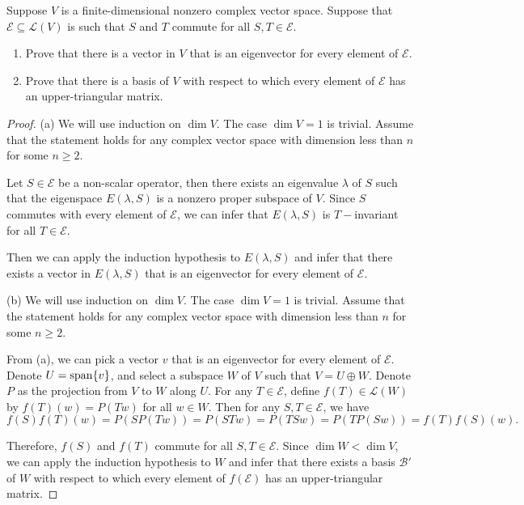 \documentclass{article}
\begin{document}
\begin{problem}[5E-9]
Suppose $V$ is a finite-dimensional nonzero complex vector space. Suppose that $\mathcal{E} \subseteq \mathcal{L}(V)$ is such that $S$ and $T$ commute for all $S, T \in \mathcal{E}$.
\begin{enumerate}[label=(\alph*)]
\item Prove that there is a vector in $V$ that is an eigenvector for every element of $\mathcal{E}$.
\item Prove that there is a basis of $V$ with respect to which every element of $\mathcal{E}$ has an upper-triangular matrix.
\end{enumerate}
\end{problem}

\begin{proof}
  (a) We will use induction on \( \dim V \). The case \( \dim V=1 \) is trivial. Assume that the statement holds for any complex vector space with dimension less than \( n \) for some \( n\geq 2 \). \par
  Let \( S\in\mathcal{E} \) be a non-scalar operator, then there exists an eigenvalue \( \lambda \) of \( S \) such that the eigenspace \( E(\lambda,S) \) is a nonzero proper subspace of \( V \). Since \( S \) commutes with every element of \( \mathcal{E} \), we can infer that \( E(\lambda,S) \) is \( T- \)invariant for all \( T\in\mathcal{E} \). \par
  Then we can apply the induction hypothesis to \( E(\lambda,S) \) and infer that there exists a vector in \( E(\lambda,S) \) that is an eigenvector for every element of \( \mathcal{E} \).\par
  (b) We will use induction on \( \dim V \). The case \( \dim V=1 \) is trivial. Assume that the statement holds for any complex vector space with dimension less than \( n \) for some \( n\geq 2 \). \par
  From (a), we can pick a vector \( v \) that is an eigenvector for every element of \( \mathcal{E} \). Denote \( U=\operatorname{span}\{v\} \), and select a subspace \( W \) of \( V \) such that \( V=U\oplus W \). Denote \( P \) as the projection from \( V \) to \( W \) along \( U \). For any \( T\in\mathcal{E} \), define \( f(T)\in \mathcal{L}(W) \) by \( f(T)(w)=P(Tw) \) for all \( w\in W \). Then for any \( S,T\in \mathcal{E} \), we have
  \[ f(S)f(T)(w)=P(SP(Tw))=P(STw)=P(TSw)=P(TP(Sw))=f(T)f(S)(w). \]\par
  Therefore, \( f(S) \) and \( f(T) \) commute for all \( S,T\in\mathcal{E} \). Since \( \dim W < \dim V \), we can apply the induction hypothesis to \( W \) and infer that there exists a basis \( \mathcal{B}' \) of \( W \) with respect to which every element of \( f(\mathcal{E}) \) has an upper-triangular matrix.\par

\end{proof}
\end{document}
